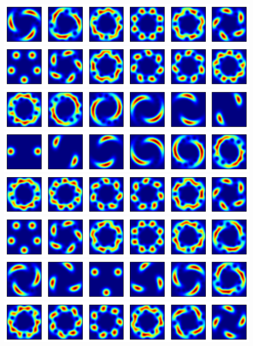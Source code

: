 \documentclass[10pt,fleqn]{article}
\begin{document}
\includegraphics[width=15cm]{3-5-7.png}\\
\includegraphics[width=15cm]{3-5-8.png}\\
\includegraphics[width=15cm]{3-5-9.png}\\
\includegraphics[width=15cm]{3-5-10.png}\\
\includegraphics[width=15cm]{3-5-11.png}\\
\includegraphics[width=15cm]{3-5-12.png}\\
\includegraphics[width=15cm]{3-5-13.png}\\
\includegraphics[width=15cm]{3-5-14.png}\\
\end{document}
